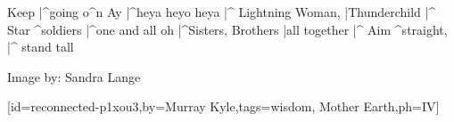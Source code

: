     Keep |^going o^n Ay |^heya heyo heya
  \endverse
  \beginverse
    |^ Lightning Woman, |Thunderchild
    |^ Star ^soldiers |^one and all oh
    |^Sisters, Brothers |all together
    |^ Aim ^straight, |^ stand tall
  \endverse
  \begin{explanation}[EN]
    \begin{center}
      {\tiny Image by: Sandra Lange}%
    \end{center}
  \end{explanation}
\endsong


[id={reconnected-p1xou3},by={Murray Kyle},tags={wisdom, Mother Earth},ph={IV}]
  \beginverse
\]\]\]\]\]\]\]\]\]\]\]\]\]\]\]\]\]\]\]\]\]\]\]\]\]\]\]\]\]\]\]\]\]\]\]\]\]\]\]\]\]\]\]\]\]\]\]\]\]\]\]\]\]\]\]\]\]\]\]\]\]\]\]\]\]\]\]\]\]\]\]\]\]\]\]\]\]\]\]\]\]\]\]\]\]\]\]\]\]\]\]\]\]\]\]\]\]\]\]\]\]\]\]\]\]\]\]\]\]\]\]\]\]\]\]\]\]\]\]\]\]\]\]\]\]\]\]\]\]\]\]\]\]\]\]\]\]\]\]\]\]\]\]\]\]\]\]\]\]\]\]\]\]\]\]\]\]\]\]\]\]\]\]\]\]\]\]\]\]\]\]\]\]\]\]\]\]\]\]\]\]\]\]\]\]\]\]\]\]\]\]\]\]\]\]\]\]\]\]\]\]\]\]\]\]\]\]\]\]\]\]\]\]\]\]\]\]\]\]\]\]\]\]\]\]\]\]\]\]\]\]\]\]\]\]\]\]\]\]\]\]\]\]\]\]\]\]\]\]\]\]\]\]\]\]\]\]\]\]\]\]\]\]\]\]\]\]\]\]\]\]\]\]\]\]\]\]\]\]\]\]\]\]\]\]\]\]\]\]\]\]\]\]\]\]\]\]\]\]\]\]\]\]\]\]\]\]\]\]\]\]\]\]\]\]\]\]\]\]\]\]\]\]\]\]\]\]\]\]\]\]\]\]\]\]\]\]\]\]\]\]\]\]\]\]\]\]\]\]\]\]\]\]\]\]\]\]\]\]\]\]\]\]\]\]\]\]\]\]\]\]\]\]\]\]\]\]\]\]\]\]\]\]\]\]\]\]\]\]\]\]\]\]\]\]\]\]\]\]\]\]\]\]\]\]\]\]\]\]\]\]\]\]\]\]\]\]\]\]\]\]\]\]\]\]\]\]\]\]\]\]\]\]\]\]\]\]\]\]\]\]\]\]\]\]\]\]\]\]\]\]\]\]\]\]\]\]\]\]\]\]\]\]\]\]\]\]\]\]\]\]\]\]\]\]\]\]\]\]\]\]\]\]\]\]\]\]\]\]\]\]\]\]\]\]\]\]\]\]\]\]\]\]\]\]\]\]\]\]\]\]\]\]\]\]\]\]\]\]\]\]\]\]\]\]\]\]\]\]\]\]\]\]\]\]\]\]\]\]\]\]\]\]\]\]\]\]\]\]\]\]\]\]\]\]\]\]\]\]\]\]\]\]\]\]\]\]\]\]\]\]\]\]\]\]\]\]\]\]\]\]\]\]\]\]\]\]\]\]\]\]\]\]\]\]\]\]\]\]\]\]\]\]\]\]\]\]\]\]\]\]\]\]\]\]\]\]\]\]\]\]\]\]\]\]\]\]\]\]\]\]\]\]\]\]\]\]\]\]\]\]\]\]\]\]\]\]\]\]\]\]\]\]\]\]\]\]\]\]\]\]\]\]\]\]\]\]\]\]\]\]\]\]\]\]\]\]\]\]\]\]\]\]\]\]\]\]\]\]\]\]\]\]\]\]\]\]\]\]\]\]\]\]\]\]\]\]\]\]\]\]\]\]\]\]\]\]\]\]\]\]\]\]\]\]\]\]\]\]\]\]\]\]\]\]\]\]\]\]\]\]\]\]\]\]\]\]\]\]\]\]\]\]\]\]\]\]\]\]\]\]\]\]\]\]\]\]\]\]\]\]\]\]\]\]\]\]\]\]\]\]\]\]\]\]\]\]\]\]\]\]\]\]\]\]\]\]\]\]\]\]\]\]\]\]\]\]\]\]\]\]\]\]\]\]\]\]\]\]\]\]\]\]\]\]\]\]\]\]\]\]\]\]\]\]\]\]\]\]\]\]\]\]\]\]\]\]\]\]\]\]\]\]\]\]\]\]\]\]\]\]\]\]\]\]\]\]\]\]\]\]\]\]\]\]\]\]\]\]\]\]\]\]\]\]\]\]\]\]\]\]\]\]\]\]\]\]\]\]\]\]\]\]\]\]\]\]\]\]\]\]\]\]\]\]\]\]\]\]\]\]\]\]\]\]\]\]\]\]\]\]\]\]\]\]\]\]\]\]\]\]\]\]\]\]\]\]\]\]\]\]\]\]\]\]\]\]\]\]\]\]\]\]\]\]\]\]\]\]\]\]\]\]\]\]\]\]\]\]\]\]\]\]\]\]\]\]\]\]\]\]\]\]\]\]\]\]\]\]\]\]\]\]\]\]\]\]\]\]\]\]\]\]\]\]\]\]\]\]\]\]\]\]\]\]\]\]\]\]\]\]\]\]\]\]\]\]\]\]\]\]\]\]\]\]\]\]\]\]\]\]\]\]\]\]\]\]\]\]\]\]\]\]\]\]\]\]\]\]\]\]\]\]\]\]\]\]\]\]\]\]\]\]\]\]\]\]\]\]\]\]\]\]\]\]\]\]\]\]\]\]\]\]\]\]\]\]\]\]\]\]\]\]\]\]\]\]\]\]\]\]\]\]\]\]\]\]\]\]\]\]\]\]\]\]\]\]\]\]\]\]\]\]\]\]\]\]\]\]\]\]\]\]\]\]\]\]\]\]\]\]\]\]\]\]\]\]\]\]\]\]\]\]\]\]\]\]\]\]\]\]\]\]\]\]\]\]\]\]\]\]\]\]\]\]\]\]\]\]\]\]\]\]\]\]\]\]\]\]\]\]\]\]\]\]\]\]\]\]\]\]\]
